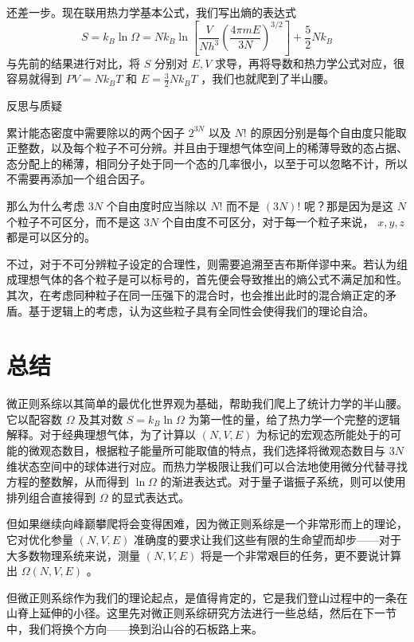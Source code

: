 还差一步。现在联用热力学基本公式，我们写出熵的表达式
\[
    S = k_B\ln \Omega = Nk_B \ln\left[ \frac{V}{N h^3} \left(\frac{4\pi mE}{3N} \right)^{3/2}  \right] + \frac{5}{2} N k_B
\]
与先前的结果进行对比，将 $S$ 分别对 $E,V$ 求导，再将导数和热力学公式对应，很容易就得到 $PV = Nk_B T$ 和 $E = \frac{3}{2}N k_BT$ ，我们也就爬到了半山腰。

\begin{justification}{\kaishu 反思与质疑}
    \kaishu \fontsize{11pt}{16pt}
    
    \quad\quad 累计能态密度中需要除以的两个因子 $2^{3N}$ 以及 $N!$ 的原因分别是每个自由度只能取正整数，以及每个粒子不可分辨。并且由于理想气体空间上的稀薄导致的态占据、态分配上的稀薄，相同分子处于同一个态的几率很小，以至于可以忽略不计，所以不需要再添加一个组合因子。

    \quad\quad 那么为什么考虑 $3N$ 个自由度时应当除以 $N!$ 而不是 $(3N)!$ 呢？那是因为是这 $N$ 个粒子不可区分，而不是这 $3N$ 个自由度不可区分，对于每一个粒子来说， $x, y, z$ 都是可以区分的。

    \quad\quad 不过，对于不可分辨粒子设定的合理性，则需要追溯至吉布斯佯谬中来。若认为组成理想气体的各个粒子是可以标号的，首先便会导致推出的熵公式不满足加和性。其次，在考虑同种粒子在同一压强下的混合时，也会推出此时的混合熵正定的矛盾。基于逻辑上的考虑，认为这些粒子具有全同性会使得我们的理论自洽。
\end{justification}

\section{总结}\label{sec:微正则总结}

微正则系综以其简单的最优化世界观为基础，帮助我们爬上了统计力学的半山腰。它以配容数 $\Omega $ 及其对数 $S = k_B \ln \Omega$ 为第一性的量，给了热力学一个完整的逻辑解释。对于经典理想气体，为了计算以 $(N,V,E)$ 为标记的宏观态所能处于的可能的微观态数目，根据粒子能量所可能取值的特点，我们选择将微观态数目与 $3N$ 维状态空间中的球体进行对应。而热力学极限让我们可以合法地使用微分代替寻找方程的整数解，从而得到 $\ln \Omega$ 的渐进表达式。对于量子谐振子系统，则可以使用排列组合直接得到 $\Omega$ 的显式表达式。

但如果继续向峰巅攀爬将会变得困难，因为微正则系综是一个非常形而上的理论，它对优化参量 $(N,V,E)$ 准确度的要求让我们这些有限的生命望而却步——对于大多数物理系统来说，测量 $(N,V,E)$ 将是一个非常艰巨的任务，更不要说计算出 $\Omega(N,V,E)$ 。

但微正则系综作为我们的理论起点，是值得肯定的，它是我们登山过程中的一条在山脊上延伸的小径。这里先对微正则系综研究方法进行一些总结，然后在下一节中，我们将换个方向——换到沿山谷的石板路上来。

